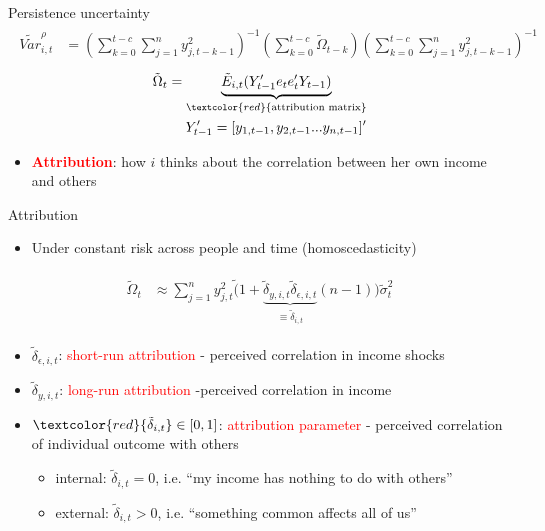 \documentclass{beamer}
\begin{document}
\begin{frame}{Persistence uncertainty}
	\begin{eqnarray}
	\begin{split}
	\tilde {Var}^{\rho}_{i,t} & =   (\sum^{t-c}_{k=0}\sum^{n}_{j=1}y^2_{j,t-k-1})^{-1}(\sum^{t-c}_{k=0}\tilde \Omega_{t-k})(\sum^{t-c}_{k=0}\sum^{n}_{j=1}y^2_{j,t-k-1})^{-1}
	\end{split}
	\end{eqnarray}
	\begin{eqnarray}
	\begin{split}
	\tilde \Omega_{t} = \underbrace{\tilde E_{i,t}(Y'_{t-1}e_{t}e_{t}'Y_{t-1})}_{\textcolor{red}{\text{attribution matrix}}} \\
	Y'_{t-1} = [y_{1,t-1},y_{2,t-1}...y_{n,t-1}]'
	\end{split}
	\end{eqnarray}
	\begin{itemize}	  
		\item \textbf{\textcolor{red}{Attribution}}: how $i$ thinks about the correlation between her own income and others
	\end{itemize}
\end{frame}


\begin{frame}{Attribution}
	
	\begin{itemize}
		\item Under constant risk across people and time (homoscedasticity)
	\end{itemize}
	\begin{eqnarray}
	\begin{split}
	\tilde \Omega_{t}  & \approx \sum^{n}_{j=1}y^2_{j,t} \tilde (1+\underbrace{\tilde \delta_{y,i,t}\tilde \delta_{\epsilon,i,t}}_{\equiv \tilde \delta_{i,t}}(n-1)) \tilde \sigma^2_{t} 
	\end{split}
	\end{eqnarray}
	\begin{itemize}
		\item $\tilde \delta_{\epsilon, i,t}$: \textcolor{red}{short-run attribution} -  perceived correlation in income shocks 
		\item $\tilde \delta_{y, i,t}$: \textcolor{red}{long-run attribution} -perceived correlation in income 
		\item $\textcolor{red}{\tilde \delta_{i,t}} \in [0,1]$: \textcolor{red}{attribution parameter} - perceived correlation of individual outcome with others 
		\begin{itemize}
			\item internal: $\tilde \delta_{i,t} =0$, i.e. ``my income has nothing to do with others''
			\item external: $\tilde \delta_{i,t} >0$, i.e. ``something common affects all of us''
		\end{itemize}
	\end{itemize}
\end{frame}
\end{document}
